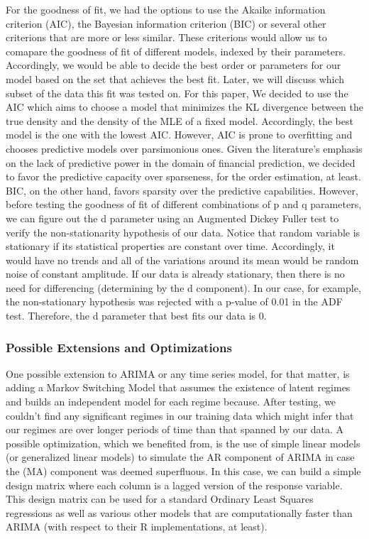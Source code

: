 For the goodness of fit, we had the options to use the Akaike information criterion (AIC), the Bayesian information criterion (BIC) or several other criterions that are more or less similar. These criterions would allow us to comapare the goodness of fit of different models, indexed by their parameters. Accordingly, we would be able to decide the best order or parameters for our model based on the set that achieves the best fit. Later, we will discuss which subset of the data this fit was tested on.
For this paper, We decided to use the AIC which aims to choose a model that minimizes the KL divergence between the true density and the density of the MLE of a fixed model. Accordingly, the best model is the one with the lowest AIC. However, AIC is prone to overfitting and chooses predictive models over parsimonious ones. Given the literature's emphasis on the lack of predictive power in the domain of financial prediction, we decided to favor the predictive capacity over sparseness, for the order estimation, at least. BIC, on the other hand, favors sparsity over the predictive capabilities.
However, before testing the goodness of fit of different combinations of p and q parameters, we can figure out the d parameter using an Augmented Dickey Fuller test to verify the non-stationarity hypothesis of our data. Notice that random variable is stationary if its statistical properties are constant over time. Accordingly, it would have no trends and all of the variations around its mean would be random noise of constant amplitude. \cite{tsay, VAR}
If our data is already stationary, then there is no need for differencing (determining by the d component). In our case, for example, the non-stationary hypothesis was rejected with a p-value of 0.01 in the ADF test. Therefore, the d parameter that best fits our data is 0.
\subsubsection{Possible Extensions and Optimizations}
One possible extension to ARIMA or any time series model, for that matter, is adding a Markov Switching Model that assumes the existence of latent regimes and builds an independent model for each regime because.\cite{MS} After testing, we couldn't find any significant regimes in our training data which might infer that our regimes are over longer periods of time than that spanned by our data.
A possible optimization, which we benefited from, is the use of simple linear models (or generalized linear models) to simulate the AR component of ARIMA in case the (MA) component was deemed superfluous. In this case, we can build a simple design matrix where each column is a lagged version of the response variable. This design matrix can be used for a standard Ordinary Least Squares regressions as well as various other models that are computationally faster than ARIMA (with respect to their R implementations, at least).
